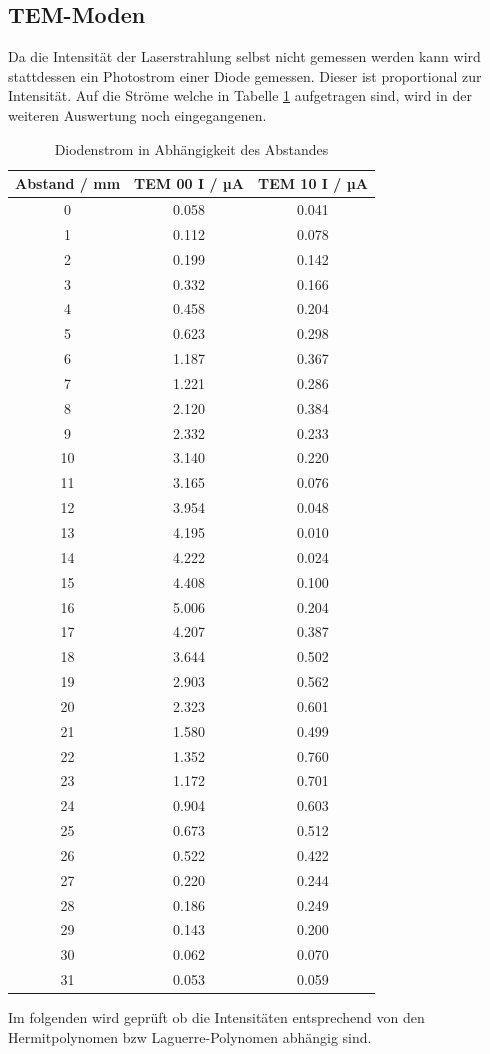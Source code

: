 \subsection{TEM-Moden}
Da die Intensität der Laserstrahlung selbst nicht gemessen werden kann wird stattdessen ein Photostrom einer Diode gemessen. Dieser ist proportional zur Intensität. Auf die Ströme welche in Tabelle \ref{tab:tem} aufgetragen sind, wird in der weiteren Auswertung noch eingegangenen.
\begin{table}
  \centering
  \begin{tabular}{c|c c}
     \toprule
     	Abstand / mm & TEM 00 I / µA & TEM 10 I / µA \\
     \midrule
     0		& 0.058		& 0.041	\\
     1		& 0.112		& 0.078	\\
     2		& 0.199		& 0.142	\\
     3		& 0.332		& 0.166	\\
     4		& 0.458		& 0.204	\\
     5		& 0.623		& 0.298	\\
     6		& 1.187		& 0.367	\\
     7		& 1.221		& 0.286	\\
     8		& 2.120		& 0.384	\\
     9		& 2.332		& 0.233	\\
     10		& 3.140		& 0.220	\\
     11		& 3.165		& 0.076	\\
     12		& 3.954		& 0.048	\\
     13		& 4.195		& 0.010	\\
     14		& 4.222		& 0.024	\\
     15		& 4.408		& 0.100	\\
     16		& 5.006		& 0.204	\\
     17		& 4.207		& 0.387	\\
     18		& 3.644		& 0.502	\\
     19		& 2.903		& 0.562	\\
     20		& 2.323		& 0.601	\\
     21		& 1.580		& 0.499	\\
     22		& 1.352		& 0.760	\\
     23		& 1.172		& 0.701	\\
     24		& 0.904		& 0.603	\\
     25		& 0.673		& 0.512	\\
     26		& 0.522		& 0.422	\\
     27		& 0.220		& 0.244	\\
     28		& 0.186		& 0.249	\\
     29		& 0.143		& 0.200	\\
     30		& 0.062		& 0.070	\\
     31		& 0.053		& 0.059	\\
     \bottomrule
  \end{tabular}
  \caption{Diodenstrom in Abhängigkeit des Abstandes}
  \label{tab:tem}
\end{table}
Im folgenden wird geprüft ob die Intensitäten entsprechend von den Hermitpolynomen bzw Laguerre-Polynomen abhängig sind.

